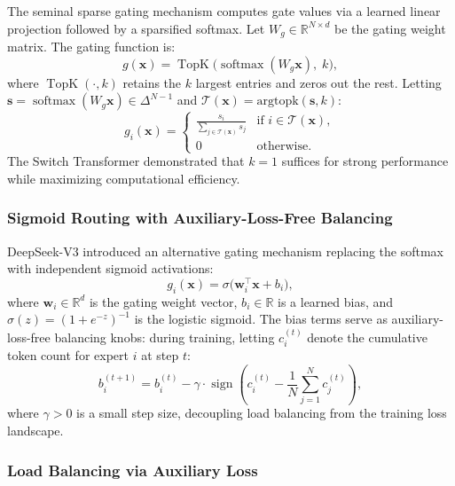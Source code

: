 \documentclass[11pt,a4paper]{article}
\newcommand{\R}{\mathbb{R}}
\DeclareMathOperator{\TopK}{TopK}
\DeclareMathOperator{\softmax}{softmax}
\DeclareMathOperator{\sign}{sign}
\begin{document}
The seminal sparse gating mechanism \citep{shazeer2017outrageously} computes gate values via a learned linear projection followed by a sparsified softmax. Let $W_g \in \R^{N \times d}$ be the gating weight matrix. The gating function is:
\begin{equation}\label{eq:topk_routing}
    g(\mathbf{x}) = \TopK\bigl(\softmax(W_g \mathbf{x}),\; k\bigr),
\end{equation}
where $\TopK(\cdot, k)$ retains the $k$ largest entries and zeros out the rest. Letting $\mathbf{s} = \softmax(W_g \mathbf{x}) \in \Delta^{N-1}$ and $\mathcal{T}(\mathbf{x}) = \mathrm{argtopk}(\mathbf{s}, k)$:
\begin{equation}
    g_i(\mathbf{x}) = \begin{cases}
        \displaystyle\frac{s_i}{\sum_{j \in \mathcal{T}(\mathbf{x})} s_j} & \text{if } i \in \mathcal{T}(\mathbf{x}), \\[6pt]
        0 & \text{otherwise}.
    \end{cases}
\end{equation}
The Switch Transformer \citep{fedus2022switch} demonstrated that $k=1$ suffices for strong performance while maximizing computational efficiency.

\subsubsection{Sigmoid Routing with Auxiliary-Loss-Free Balancing}

DeepSeek-V3 \citep{deepseekai2024deepseekv3} introduced an alternative gating mechanism replacing the softmax with independent sigmoid activations:
\begin{equation}\label{eq:sigmoid_gating}
    g_i(\mathbf{x}) = \sigma\bigl(\mathbf{w}_i^\top \mathbf{x} + b_i\bigr),
\end{equation}
where $\mathbf{w}_i \in \R^d$ is the gating weight vector, $b_i \in \R$ is a learned bias, and $\sigma(z) = (1 + e^{-z})^{-1}$ is the logistic sigmoid. The bias terms serve as auxiliary-loss-free balancing knobs: during training, letting $c_i^{(t)}$ denote the cumulative token count for expert $i$ at step $t$:
\begin{equation}
    b_i^{(t+1)} = b_i^{(t)} - \gamma \cdot \sign\!\left(c_i^{(t)} - \frac{1}{N}\sum_{j=1}^{N} c_j^{(t)}\right),
\end{equation}
where $\gamma > 0$ is a small step size, decoupling load balancing from the training loss landscape.

\subsubsection{Load Balancing via Auxiliary Loss}
\end{document}
